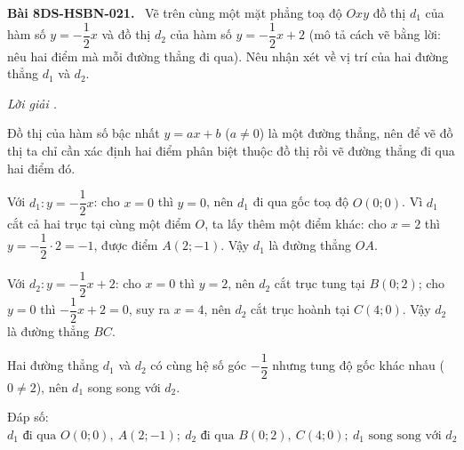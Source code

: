 \documentclass[12pt,a4paper]{article}
\newenvironment{problem}[1][]{\par\medskip\noindent\textbf{Bài #1.}\ }{\par}
\newenvironment{solution}[1][]{\par\noindent\textit{Lời giải #1.}\par}{\par}
\begin{document}
\begin{problem}[8DS-HSBN-021]
Vẽ trên cùng một mặt phẳng toạ độ $Oxy$ đồ thị $d_1$ của hàm số $y = -\dfrac{1}{2}x$ và đồ thị $d_2$ của hàm số $y = -\dfrac{1}{2}x + 2$ (mô tả cách vẽ bằng lời: nêu hai điểm mà mỗi đường thẳng đi qua). Nêu nhận xét về vị trí của hai đường thẳng $d_1$ và $d_2$.

\begin{solution}
Đồ thị của hàm số bậc nhất $y = ax + b$ ($a \neq 0$) là một đường thẳng, nên để vẽ đồ thị ta chỉ cần xác định hai điểm phân biệt thuộc đồ thị rồi vẽ đường thẳng đi qua hai điểm đó.

Với $d_1\colon y = -\dfrac{1}{2}x$: cho $x = 0$ thì $y = 0$, nên $d_1$ đi qua gốc toạ độ $O(0; 0)$. Vì $d_1$ cắt cả hai trục tại cùng một điểm $O$, ta lấy thêm một điểm khác: cho $x = 2$ thì $y = -\dfrac{1}{2} \cdot 2 = -1$, được điểm $A(2; -1)$. Vậy $d_1$ là đường thẳng $OA$.

Với $d_2\colon y = -\dfrac{1}{2}x + 2$: cho $x = 0$ thì $y = 2$, nên $d_2$ cắt trục tung tại $B(0; 2)$; cho $y = 0$ thì $-\dfrac{1}{2}x + 2 = 0$, suy ra $x = 4$, nên $d_2$ cắt trục hoành tại $C(4; 0)$. Vậy $d_2$ là đường thẳng $BC$.

Hai đường thẳng $d_1$ và $d_2$ có cùng hệ số góc $-\dfrac{1}{2}$ nhưng tung độ gốc khác nhau ($0 \neq 2$), nên $d_1$ song song với $d_2$.

Đáp số: $\boxed{d_1 \text{ đi qua } O(0; 0),\ A(2; -1);\ d_2 \text{ đi qua } B(0; 2),\ C(4; 0);\ d_1 \text{ song song với } d_2}$
\end{solution}
\end{problem}
\end{document}
